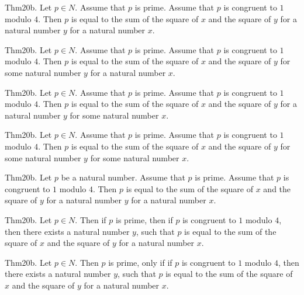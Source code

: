 \documentclass{article}
\begin{document}
Thm20b. Let $p \in N$. Assume that $p$ is prime. Assume that $p$ is congruent to $1$ modulo $4$. Then $p$ is equal to the sum of the square of $x$ and the square of $y$ for a natural number $y$ for a natural number $x$.

Thm20b. Let $p \in N$. Assume that $p$ is prime. Assume that $p$ is congruent to $1$ modulo $4$. Then $p$ is equal to the sum of the square of $x$ and the square of $y$ for some natural number $y$ for a natural number $x$.

Thm20b. Let $p \in N$. Assume that $p$ is prime. Assume that $p$ is congruent to $1$ modulo $4$. Then $p$ is equal to the sum of the square of $x$ and the square of $y$ for a natural number $y$ for some natural number $x$.

Thm20b. Let $p \in N$. Assume that $p$ is prime. Assume that $p$ is congruent to $1$ modulo $4$. Then $p$ is equal to the sum of the square of $x$ and the square of $y$ for some natural number $y$ for some natural number $x$.

Thm20b. Let $p$ be a natural number. Assume that $p$ is prime. Assume that $p$ is congruent to $1$ modulo $4$. Then $p$ is equal to the sum of the square of $x$ and the square of $y$ for a natural number $y$ for a natural number $x$.

Thm20b. Let $p \in N$. Then if $p$ is prime, then if $p$ is congruent to $1$ modulo $4$, then there exists a natural number $y$, such that $p$ is equal to the sum of the square of $x$ and the square of $y$ for a natural number $x$.

Thm20b. Let $p \in N$. Then $p$ is prime, only if if $p$ is congruent to $1$ modulo $4$, then there exists a natural number $y$, such that $p$ is equal to the sum of the square of $x$ and the square of $y$ for a natural number $x$.
\end{document}

